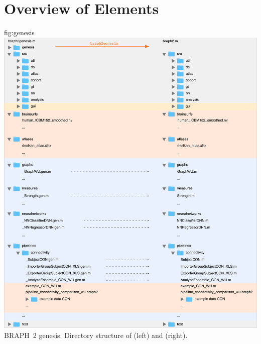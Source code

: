\documentclass{tufte-handout}
\begin{document}
\section{Overview of Elements}

	{fig:genesis}
	{\includegraphics{../braph2genesis.png}}
	{BRAPH~2 genesis.}
	{
	Directory structure of  (left) and  (right).
	}

\end{document}

